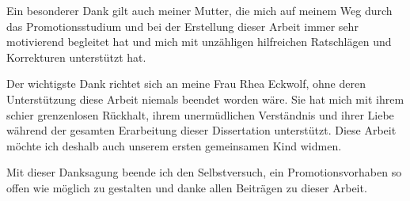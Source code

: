 Ein besonderer Dank gilt auch meiner Mutter, die mich auf meinem Weg durch das Promotionsstudium und bei der Erstellung dieser Arbeit immer sehr motivierend begleitet hat und mich mit unzähligen hilfreichen Ratschlägen und Korrekturen unterstützt hat.

Der wichtigste Dank richtet sich an meine Frau Rhea Eckwolf, ohne deren Unterstützung diese Arbeit niemals beendet worden wäre. Sie hat mich mit ihrem schier grenzenlosen Rückhalt, ihrem unermüdlichen Verständnis und ihrer Liebe während der gesamten Erarbeitung dieser Dissertation unterstützt. Diese Arbeit möchte ich deshalb auch unserem ersten gemeinsamen Kind widmen.

Mit dieser Danksagung beende ich den Selbstversuch, ein Promotionsvorhaben so offen wie möglich zu gestalten und danke allen Beiträgen zu dieser Arbeit.
